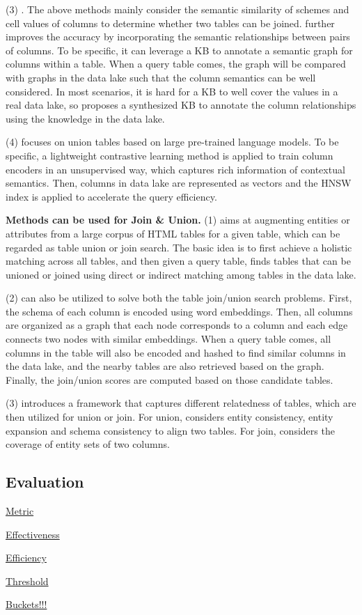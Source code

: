   \noindent  (3) \santos. The above methods mainly consider  the semantic similarity of  schemes and cell values of columns to determine whether two tables can be joined.
   \santos further improves the accuracy by incorporating the semantic relationships between pairs of columns. To be specific,  it can leverage a KB to annotate a semantic graph for columns within a table. When a query table comes, the graph will be compared with graphs in the data lake such that the column semantics can be well considered. In most scenarios, it is hard for a KB to well cover the values in a real data lake, so \santos proposes a synthesized KB to annotate the column relationships using the knowledge in the data lake.

 \noindent  (4) \starmie focuses on union tables based on large  pre-trained language models. To be specific, a lightweight contrastive learning method is applied to train 
column encoders in an unsupervised way, which captures rich information of contextual semantics. Then, columns in data lake are represented as vectors and the HNSW index is applied to accelerate the query efficiency.


\noindent\textbf{Methods can be used for Join \& Union.}
  (1) \infogather aims at augmenting entities or attributes from a large corpus of HTML tables for a given table, which can be regarded as table union or join search. The basic idea is to first achieve a holistic matching across all tables, and then  given a query table,  \infogather finds tables that can be unioned or joined using direct or indirect matching among tables in the data lake.
 
 
  \noindent  (2) \aurum can also be utilized to solve  both the table join/union search problems. First, the schema of each column is encoded using word embeddings. Then, all columns are organized as a graph that each node corresponds to a column and each edge connects two nodes with similar embeddings. When a query table comes, all columns in the table will also be encoded and hashed to find similar columns in the data lake, and  the nearby tables are also retrieved based on the graph. Finally, the join/union scores are computed based on those candidate tables.  
  
    \noindent  (3) \frt introduces a framework that captures different relatedness of tables, which are then utilized for union or join. For union,  \frt considers entity consistency, entity expansion and schema consistency to align two tables. For join, \frt considers the coverage of entity sets of two columns.

\subsection{Evaluation}

\noindent\underline{Metric}

\noindent\underline{Effectiveness}

\noindent\underline{Efficiency}

\noindent\underline{Threshold}

\noindent\underline{Buckets!!!}


